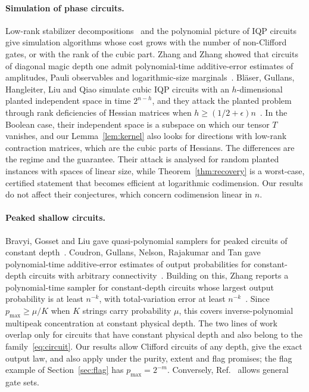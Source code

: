 \documentclass[a4paper,onecolumn,11pt,unpublished]{quantumarticle}
\theoremstyle{plain}
\theoremstyle{remark}
\begin{document}
\paragraph{Simulation of phase circuits.}
Low-rank stabilizer decompositions~\cite{BBC19} and the polynomial picture of IQP circuits~\cite{Mon17} give simulation algorithms whose cost grows with the number of non-Clifford gates, or with the rank of the cubic part. Zhang and Zhang showed that circuits of diagonal magic depth one admit polynomial-time additive-error estimates of amplitudes, Pauli observables and logarithmic-size marginals~\cite{ZZ24}. Bl\"aser, Gullans, Hangleiter, Liu and Qiao simulate cubic IQP circuits with an $h$-dimensional planted independent space in time $2^{n-h}$, and they attack the planted problem through rank deficiencies of Hessian matrices when $h\ge(1/2+\epsilon)n$~\cite{BGHLQ26}. In the Boolean case, their independent space is a subspace on which our tensor $T$ vanishes, and our Lemma~\ref{lem:kernel} also looks for directions with low-rank contraction matrices, which are the cubic parts of Hessians. The differences are the regime and the guarantee. Their attack is analysed for random planted instances with spaces of linear size, while Theorem~\ref{thm:recovery} is a worst-case, certified statement that becomes efficient at logarithmic codimension. Our results do not affect their conjectures, which concern codimension linear in $n$.

\paragraph{Peaked shallow circuits.}
Bravyi, Gosset and Liu gave quasi-polynomial samplers for peaked circuits of constant depth~\cite{BGL24}. Coudron, Gullans, Nelson, Rajakumar and Tan gave polynomial-time additive-error estimates of output probabilities for constant-depth circuits with arbitrary connectivity~\cite{CGN26}. Building on this, Zhang reports a polynomial-time sampler for constant-depth circuits whose largest output probability is at least $n^{-k}$, with total-variation error at least $n^{-k}$~\cite{Zha26}. Since $p_{\max}\ge\mu/K$ when $K$ strings carry probability $\mu$, this covers inverse-polynomial multipeak concentration at constant physical depth. The two lines of work overlap only for circuits that have constant physical depth and also belong to the family~\eqref{eq:circuit}. Our results allow Clifford circuits of any depth, give the exact output law, and also apply under the purity, extent and flag promises; the flag example of Section~\ref{sec:flag} has $p_{\max}=2^{-m}$. Conversely, Ref.~\cite{Zha26} allows general gate sets.
\end{document}
